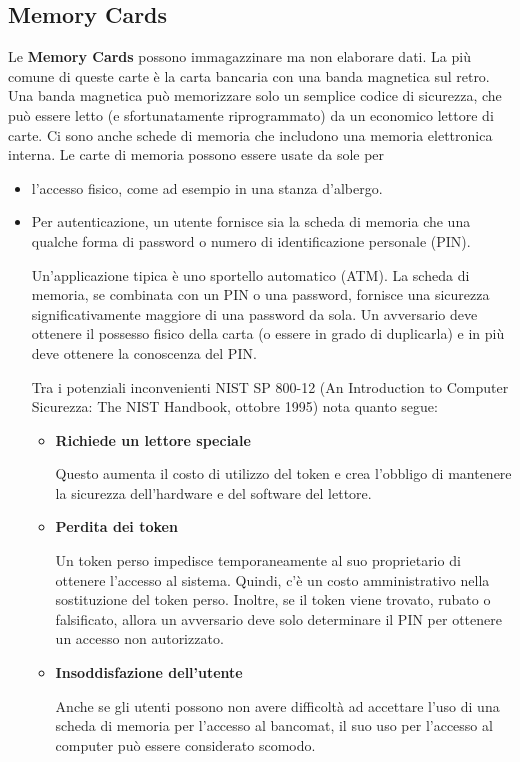 \subsection{Memory Cards}
Le \textbf{Memory Cards} possono immagazzinare ma non elaborare dati.
\singlespacing
La più comune di queste carte è la carta bancaria con una banda magnetica sul retro. Una banda magnetica può memorizzare solo un semplice codice di sicurezza, che può essere letto (e sfortunatamente riprogrammato) da un economico lettore di carte. Ci sono anche schede di memoria che includono una memoria elettronica interna. Le carte di memoria possono essere usate da sole per
\begin{itemize}
    \item l'accesso fisico, come ad esempio in una stanza d'albergo.
    
    \item Per autenticazione, un utente fornisce sia la scheda di memoria che una qualche forma di password o numero di identificazione personale (PIN).
    
    Un'applicazione tipica è uno sportello automatico (ATM). La scheda di memoria, se combinata con un PIN o una password, fornisce una sicurezza significativamente maggiore di una password da sola. Un avversario deve ottenere il possesso fisico della carta (o essere in grado di duplicarla) e in più deve ottenere la conoscenza del PIN. 
    
    \singlespacing
    
    Tra i potenziali inconvenienti NIST SP 800-12 (An Introduction to Computer Sicurezza: The NIST Handbook, ottobre 1995) nota quanto segue:
    
    \begin{itemize}
        \item \textbf{Richiede un lettore speciale}
        
        Questo aumenta il costo di utilizzo del token e crea l'obbligo di mantenere la sicurezza dell'hardware e del software del lettore.
        
        \item \textbf{Perdita dei token} 
        
        Un token perso impedisce temporaneamente al suo proprietario di ottenere l'accesso al sistema. Quindi, c'è un costo amministrativo nella sostituzione del token perso. Inoltre, se il token viene trovato, rubato o falsificato, allora un avversario deve solo determinare il PIN per ottenere un accesso non autorizzato.
        
        \item \textbf{Insoddisfazione dell'utente}
        
        Anche se gli utenti possono non avere difficoltà ad accettare l'uso di una scheda di memoria per l'accesso al bancomat, il suo uso per l'accesso al computer può essere considerato scomodo.
        
    \end{itemize}
\end{itemize}


